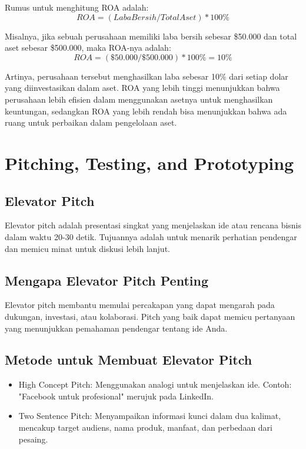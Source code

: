 \documentclass{article}
\begin{document}
Rumus untuk menghitung ROA adalah:
\begin{equation}
    ROA = (Laba Bersih / Total Aset) * 100\%
\end{equation}

Misalnya, jika sebuah perusahaan memiliki laba bersih sebesar \$50.000 dan total aset sebesar \$500.000, maka ROA-nya adalah:
\begin{equation}
    ROA = (\$50.000 / \$500.000) * 100\% = 10\%
\end{equation}

Artinya, perusahaan tersebut menghasilkan laba sebesar 10\% dari setiap dolar yang diinvestasikan dalam aset. ROA yang lebih tinggi menunjukkan bahwa perusahaan lebih efisien dalam menggunakan asetnya untuk menghasilkan keuntungan, sedangkan ROA yang lebih rendah bisa menunjukkan bahwa ada ruang untuk perbaikan dalam pengelolaan aset.

\newpage

\section{Pitching, Testing, and Prototyping}
\subsection{Elevator Pitch}
Elevator pitch adalah presentasi singkat yang menjelaskan ide atau rencana bisnis dalam waktu 20-30 detik. Tujuannya adalah untuk menarik perhatian pendengar dan memicu minat untuk diskusi lebih lanjut.

\subsection{Mengapa Elevator Pitch Penting}
Elevator pitch membantu memulai percakapan yang dapat mengarah pada dukungan, investasi, atau kolaborasi. Pitch yang baik dapat memicu pertanyaan yang menunjukkan pemahaman pendengar tentang ide Anda.

\subsection{Metode untuk Membuat Elevator Pitch}
\begin{itemize}
    \item High Concept Pitch: Menggunakan analogi untuk menjelaskan ide. Contoh: "Facebook untuk profesional" merujuk pada LinkedIn.
    \item Two Sentence Pitch: Menyampaikan informasi kunci dalam dua kalimat, mencakup target audiens, nama produk, manfaat, dan perbedaan dari pesaing.
\end{itemize}
\end{document}
